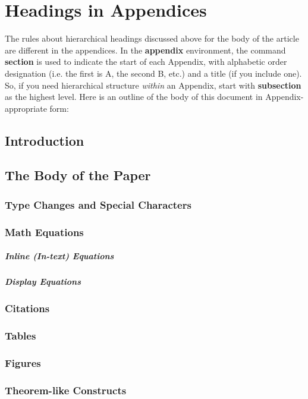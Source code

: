 \chapter{Headings in Appendices}
The rules about hierarchical headings discussed above for
the body of the article are different in the appendices.
In the \textbf{appendix} environment, the command
\textbf{section} is used to
indicate the start of each Appendix, with alphabetic order
designation (i.e. the first is A, the second B, etc.) and
a title (if you include one).  So, if you need
hierarchical structure
\textit{within} an Appendix, start with \textbf{subsection} as the
highest level. Here is an outline of the body of this
document in Appendix-appropriate form:
\section{Introduction}
\section{The Body of the Paper}
\subsection{Type Changes and  Special Characters}
\subsection{Math Equations}
\paragraph{Inline (In-text) Equations}
\paragraph{Display Equations}
\subsection{Citations}
\subsection{Tables}
\subsection{Figures}
\subsection{Theorem-like Constructs}
